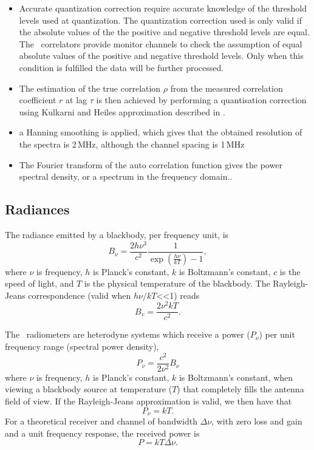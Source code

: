 \begin{itemize}

\item Accurate quantization correction require accurate knowledge of the threshold
 levels used at quantization. The quantization correction used is only valid 
if the absolute values of the the positive and negative threshold levels are equal. 
The \smr\ correlators provide monitor channels to check the
assumption of equal absolute values of the positive and negative threshold levels.
Only when this condition is fulfilled the data will be further processed.

\item The estimation of the true correlation \(\rho\) from the measured correlation
coefficient \(r\) at lag \(\tau\) is then achieved by performing a quantisation correction using
Kulkarni and Heiles approximation described in \citet{ohlberg:theod:03}.

\item a Hanning smoothing is applied, which gives that the obtained resolution 
of the spectra is 2\,MHz, although the channel spacing is 1\,MHz

\item The Fourier transform of the auto correlation function gives the
power spectral density, or a spectrum in the frequency domain..


\end{itemize}


\subsection{Radiances}


The radiance emitted by a blackbody, per frequency unit, is
\begin{equation}
 B_{\nu} = \frac{2h\nu^{3}}{c^{2}}\frac{1}{\exp(\frac{h\nu}{kT})-1},
\end{equation}   
where \(\nu\) is frequency, \(h\) is Planck's constant, \(k\) is Boltzmann's constant,
\(c\) is the speed of light, and \(T\) is the physical temperature of the
blackbody.
The Rayleigh-Jeans correspondence (valid when \(h\nu/kT\)<<1) reads
\begin{equation}
 B_{v}=\frac{2\nu^{2}kT}{c^{2}}.
\end{equation}

The \smr\ radiometers are heterodyne systems which receive a power (\(P_{\nu}\))
per unit frequency range (spectral power density),
\begin{equation}
P_{\nu} = \frac{c^{2}}{2\nu^{2}}B_{\nu}
\end{equation} 
where \(\nu\) is frequency, \(h\) is Planck's constant, \(k\) is Boltzmann's constant,
when viewing a blackbody source at temperature (\(T\)) that completely
fills the antenna field of view. 
If the Rayleigh-Jeans approximation is valid, we then have that
\begin{equation}
P_{\nu} = kT.
\end{equation}
For a theoretical receiver and channel of bandwidth \(\Delta \nu\), with zero loss and gain 
and a unit frequency response, the received power is
\begin{equation}
 P = kT\Delta \nu.
\end{equation}   

